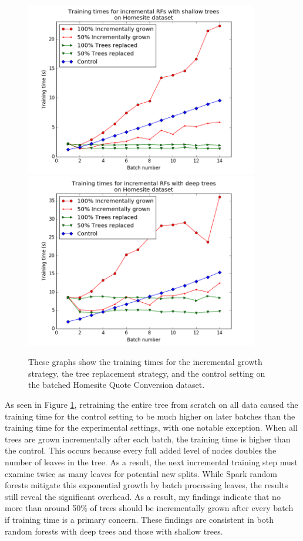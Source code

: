 \begin{figure} 
  \centering 
  \includegraphics[width=4.0in]{g1_1}\\
  \includegraphics[width=4.0in]{g2_1} 
  \caption{These graphs show the training
  times for the incremental growth strategy, the tree replacement strategy, and
the control setting on the batched Homesite Quote Conversion dataset.}
\label{fig:homesite1} 
\end{figure}

As seen in Figure \ref{fig:homesite1}, retraining the entire tree from scratch
on all data caused the training time for the control setting to be much higher
on later batches than the training time for the experimental settings, with one
notable exception. When all trees are grown incrementally after each batch, the
training time is higher than the control. This occurs because every full added
level of nodes doubles the number of leaves in the tree. As a result, the next
incremental training step must examine twice as many leaves for potential new
splits. While Spark random forests mitigate this exponential growth by batch
processing leaves, the results still reveal the significant overhead. As a
result, my findings indicate that no more than around 50\% of trees should be
incrementally grown after every batch if training time is a primary concern.
These findings are consistent in both random forests with deep trees and those
with shallow trees.

